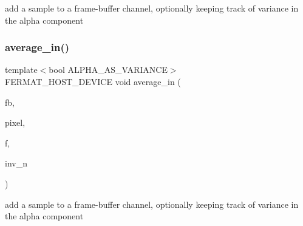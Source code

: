 add a sample to a frame-\/buffer channel, optionally keeping track of variance in the alpha component \mbox{\label{group___framebuffer_module_ga27004dfdf67948b9846f3b70efbbca67}} 
\subsubsection{\texorpdfstring{average\+\_\+in()}{average\_in()}\hspace{0.1cm}{\footnotesize\ttfamily [2/2]}}
{\footnotesize\ttfamily template$<$bool A\+L\+P\+H\+A\+\_\+\+A\+S\+\_\+\+V\+A\+R\+I\+A\+N\+CE$>$ \\
F\+E\+R\+M\+A\+T\+\_\+\+H\+O\+S\+T\+\_\+\+D\+E\+V\+I\+CE void average\+\_\+in (\begin{DoxyParamCaption}\item[{\hyperlink{struct_f_buffer_channel_view}{F\+Buffer\+Channel\+View} \&}]{fb,  }\item[{const uint32\+\_\+t}]{pixel,  }\item[{const \hyperlink{structcugar_1_1_vector}{cugar\+::\+Vector3f}}]{f,  }\item[{const float}]{inv\+\_\+n }\end{DoxyParamCaption})}

add a sample to a frame-\/buffer channel, optionally keeping track of variance in the alpha component 